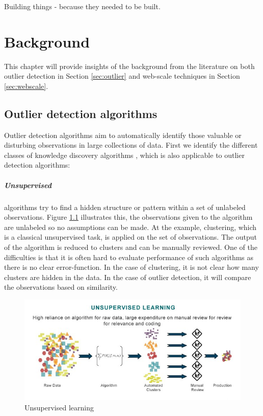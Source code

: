 \begin{savequote}[75mm] 
Building things - because they needed to be built.  
\end{savequote}

\chapter{Background}
This chapter will provide insights of the background from the literature on both outlier detection in Section \ref{sec:outlier} and web-scale techniques in Section \ref{sec:webscale}.

\section{Outlier detection algorithms \label{sec:outlier}}
Outlier detection algorithms aim to automatically identify those valuable or disturbing observations in large collections of data. First we identify the different classes of knowledge discovery algorithms \cite{Fayyad:1996:DMK:257938.257942}, which is also applicable to outlier detection algorithms:

\paragraph{Unsupervised} algorithms try to find a hidden structure or pattern within a set of unlabeled observations. Figure \ref{fig:unsupervised} illustrates this, the observations given to the algorithm are unlabeled so no assumptions can be made. At the example, clustering, which is a classical unsupervised task, is applied on the set of observations. The output of the algorithm is reduced to clusters and can be manually reviewed. One of the difficulties is that it is often hard to evaluate performance of such algorithms as there is no clear error-function. In the case of clustering, it is not clear how many clusters are hidden in the data. In the case of outlier detection, it will compare the observations based on similarity.

\begin{figure}[ht!]
\centering
\includegraphics[width=\textwidth]{figures/unsupervised.jpg}
\caption{Unsupervised learning}
\label{fig:unsupervised}
\end{figure}

